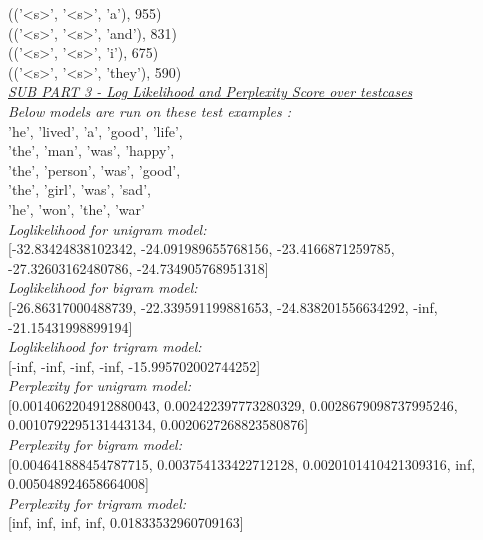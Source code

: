 \documentclass[11ppt]{article}
\begin{document}
(('\textless s\textgreater', '\textless s\textgreater', 'a'), 955) \\
(('\textless s\textgreater', '\textless s\textgreater', 'and'), 831) \\
(('\textless s\textgreater', '\textless s\textgreater', 'i'), 675) \\
(('\textless s\textgreater', '\textless s\textgreater', 'they'), 590) \\
\vspace{3mm}
\textit{\underline{SUB PART 3 - Log Likelihood and Perplexity Score over testcases}}\\
\vspace{3mm}
\textit{Below models are run on these test examples :}\\  'he', 'lived', 'a', 'good', 'life',\\ 'the', 'man', 'was', 'happy',\\ 'the', 'person', 'was', 'good',\\ 'the', 'girl', 'was', 'sad',\\ 'he', 'won', 'the', 'war'\\
\vspace{2mm}
\textit{Loglikelihood for unigram model:} \\ \vspace{1mm}  [-32.83424838102342, -24.091989655768156, -23.4166871259785, -27.32603162480786, -24.734905768951318]  \\ \vspace{2mm}
\textit{Loglikelihood for bigram model:} \\ \vspace{1mm}  [-26.86317000488739, -22.339591199881653, -24.838201556634292, -inf, -21.15431998899194]  \\ \vspace{2mm}
\textit{Loglikelihood for trigram model:} \\ \vspace{1mm}  [-inf, -inf, -inf, -inf, -15.995702002744252]  \\ \vspace{2mm}
\textit{Perplexity for unigram model:} \\ \vspace{1mm}  [0.0014062204912880043, 0.002422397773280329, 0.0028679098737995246, 0.0010792295131443134, 0.0020627268823580876]  \\ \vspace{2mm}
\textit{Perplexity for bigram model:} \\ \vspace{1mm}  [0.004641888454787715, 0.003754133422712128, 0.0020101410421309316, inf, 0.005048924658664008]  \\ \vspace{2mm}
\textit{Perplexity for trigram model:} \\ \vspace{1mm}  [inf, inf, inf, inf, 0.01833532960709163]  \\ 
\vspace{4mm}
\end{document}
